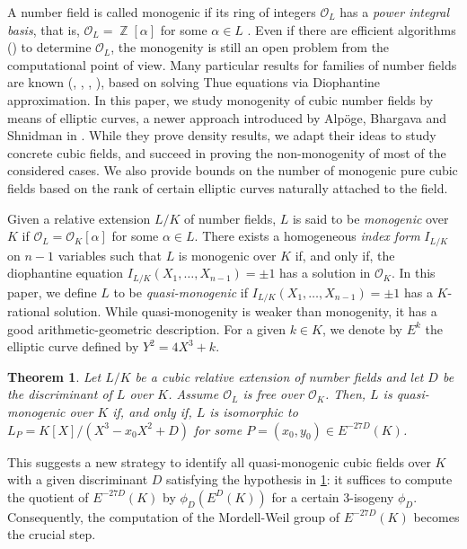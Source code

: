 \documentclass[oneside]{amsart}
\DeclareMathOperator{\ZZ}{\mathbb{Z}}
\newtheorem{theorem}[X]{Theorem}
\theoremstyle{definition}
\begin{document}
A number field is called monogenic if its ring of integers $\mathcal{O}_L $ has a {\it power integral basis}, that is,  $\mathcal{O}_L = \ZZ[\alpha]$ for some $\alpha \in L$ . Even if  there are efficient algorithms (\cite{MontesAlgorithm}) to determine $\mathcal{O}_L$,  the monogenity is still an open problem from the computational point of view. Many particular results for families of number fields are known (\cite{WILDANGER2000188}, \cite{GAAL1993563}, \cite{GAAL199690}, \cite{Gaal89}), based on solving Thue equations via Diophantine approximation. In this paper, we study monogenity of cubic number fields by means of  elliptic curves, a newer approach introduced by Alpöge, Bhargava and Shnidman in \cite{Bhargava}.  While they prove density results, we adapt their ideas to study concrete cubic fields, and succeed in proving the non-monogenity of most of the considered cases. We also provide bounds on the number of monogenic pure cubic fields based on the rank of certain elliptic curves naturally attached to the field.

Given a relative extension $L/K$ of number fields,   $L$ is said to be \textit{monogenic} over $K$ if $\mathcal{O}_L = \mathcal{O}_K[\alpha]$ for some $\alpha \in L$. There exists a homogeneous  \textit{index form}  $I_{L/K}$ on $n - 1$ variables such that   $L$ is monogenic over $K$ if, and only if, the diophantine equation $I_{L/K}(X_1,\dots,X_{n-1}) = \pm 1$ has a solution in $\mathcal{O}_K$. In this paper, we define $L$ to be \textit{quasi-monogenic} if $I_{L/K}(X_1,\dots,X_{n-1}) = \pm 1$ has a $K$-rational solution. While quasi-monogenity is weaker than monogenity, it has a good arithmetic-geometric description. For a given $k \in K$, we denote by $E^k$ the elliptic curve defined by $Y^2 = 4X^3 + k$. 
 
\begin{theorem}
    \label{theorem: characterization of quasi-monogenity}
    Let $L/K$ be a cubic relative extension of number fields and let $D$ be the discriminant of $L$ over $K$. Assume $\mathcal{O}_L$ is free over $\mathcal{O}_K$. Then, $L$ is quasi-monogenic over $K$ if, and only if, $L$ is isomorphic to $L_P=K[X]/(X^3 - x_0X^2 + D)$ for some $P =(x_0,y_0)\in E^{-27D}(K)$.
\end{theorem}
This suggests a new strategy to identify all quasi-monogenic cubic fields over $K$ with a given discriminant $D$ satisfying the hypothesis in \ref{theorem: characterization of quasi-monogenity}: it suffices  to compute the quotient of $E^{-27D}(K)$ by $\phi_D(E^D(K))$ for a certain 3-isogeny $\phi_D$. Consequently, the computation of the Mordell-Weil group of $E^{-27D}(K)$ becomes the crucial step.
\end{document}

